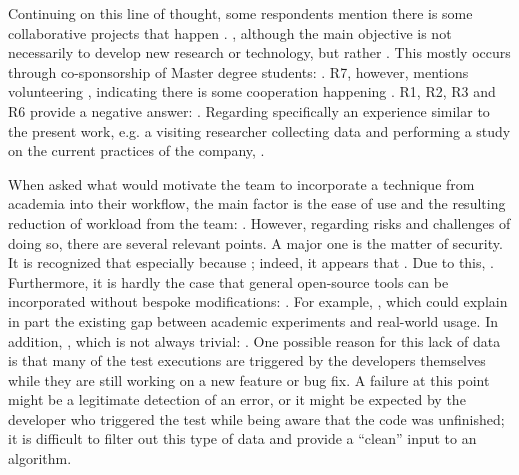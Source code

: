 Continuing on this line of thought, some respondents mention there is some collaborative projects that happen .
, although the main objective is not necessarily to develop new research or technology, but rather .
This mostly occurs through co-sponsorship of Master degree students: .
R7, however, mentions volunteering , indicating there is some cooperation happening .
R1, R2, R3 and R6 provide a negative answer: .
Regarding specifically an experience similar to the present work, e.g. a visiting researcher collecting data and performing a study on the current practices of the company, .

When asked what would motivate the team to incorporate a technique from academia into their workflow, the main factor is the ease of use and the resulting reduction of workload from the team: .
However, regarding risks and challenges of doing so, there are several relevant points.
A major one is the matter of security.
It is recognized that  especially because ; indeed, it appears that .
Due to this, .
Furthermore, it is hardly the case that general open-source tools can be incorporated without bespoke modifications: .
For example, , which could explain in part the existing gap between academic experiments and real-world usage.
In addition, , which is not always trivial: .
One possible reason for this lack of data is that many of the test executions are triggered by the developers themselves while they are still working on a new feature or bug fix. 
A failure at this point might be a legitimate detection of an error, or it might be expected by the developer who triggered the test while being aware that the code was unfinished; it is difficult to filter out this type of data and provide a ``clean'' input to an algorithm.

